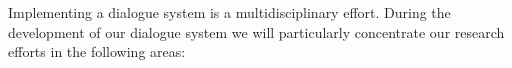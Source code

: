 
Implementing a dialogue system is a multidisciplinary effort. During the
development of our dialogue system we will particularly concentrate our research
efforts in the following areas:


